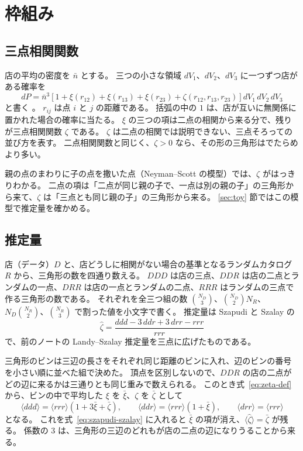\documentclass[a4paper,11pt]{ltjsarticle}
\begin{document}
\section{枠組み}
\label{sec:framework}

\subsection{三点相関関数}
\label{sec:3pcf}

店の平均の密度を $\bar n$ とする。
三つの小さな領域 $dV_1$、$dV_2$、$dV_3$ に一つずつ店がある確率を
\begin{equation}
  dP = \bar n^3 \left[ 1 + \xi(r_{12}) + \xi(r_{13}) + \xi(r_{23}) + \zeta(r_{12}, r_{13}, r_{23}) \right] dV_1\, dV_2\, dV_3
  \label{eq:zeta-def}
\end{equation}
と書く \cite{Peebles1980}。
$r_{ij}$ は点 $i$ と $j$ の距離である。
括弧の中の $1$ は、店が互いに無関係に置かれた場合の確率に当たる。
$\xi$ の三つの項は二点の相関から来る分で、残りが三点相関関数 $\zeta$ である。
$\zeta$ は二点の相関では説明できない、三点そろっての並び方を表す。
二点相関関数と同じく、$\zeta > 0$ なら、その形の三角形はでたらめより多い。

親の点のまわりに子の点を撒いた点（Neyman--Scott の模型）では、$\zeta$ がはっきりわかる。
二点の項は「二点が同じ親の子で、一点は別の親の子」の三角形から来て、$\zeta$ は「三点とも同じ親の子」の三角形から来る。
\ref{sec:toy} 節ではこの模型で推定量を確かめる。

\subsection{推定量}
\label{sec:3pcf-estimator}

店（データ）$D$ と、店どうしに相関がない場合の基準となるランダムカタログ $R$ から、三角形の数を四通り数える。
$DDD$ は店の三点、$DDR$ は店の二点とランダムの一点、$DRR$ は店の一点とランダムの二点、$RRR$ はランダムの三点で作る三角形の数である。
それぞれを全三つ組の数 $\binom{N_D}{3}$、$\binom{N_D}{2} N_R$、$N_D \binom{N_R}{2}$、$\binom{N_R}{3}$ で割った値を小文字で書く。
推定量は Szapudi と Szalay \cite{SzapudiSzalay1998} の
\begin{equation}
  \hat\zeta = \frac{ddd - 3\,ddr + 3\,drr - rrr}{rrr}
  \label{eq:szapudi-szalay}
\end{equation}
で、前のノートの Landy--Szalay 推定量を三点に広げたものである。

三角形のビンは三辺の長さをそれぞれ同じ距離のビンに入れ、辺のビンの番号を小さい順に並べた組で決めた。
頂点を区別しないので、$DDR$ の店の二点がどの辺に来るかは三通りとも同じ重みで数えられる。
このとき式~\eqref{eq:zeta-def} から、ビンの中で平均した $\xi$ を $\bar\xi$、$\zeta$ を $\bar\zeta$ として
\begin{equation}
  \langle ddd \rangle = \langle rrr \rangle (1 + 3\bar\xi + \bar\zeta), \qquad
  \langle ddr \rangle = \langle rrr \rangle (1 + \bar\xi), \qquad
  \langle drr \rangle = \langle rrr \rangle
\end{equation}
となる。
これを式~\eqref{eq:szapudi-szalay} に入れると $\bar\xi$ の項が消え、$\langle\hat\zeta\rangle = \bar\zeta$ が残る。
係数の $3$ は、三角形の三辺のどれもが店の二点の辺になりうることから来る。
\end{document}
